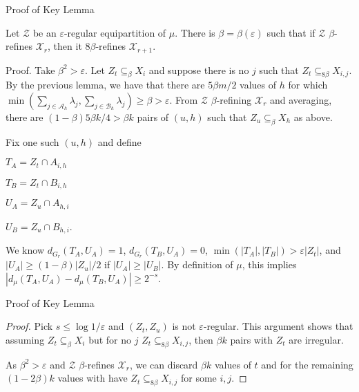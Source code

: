 \documentclass{beamer}
\newcommand{\1}{\mathbbm{1}}
\newcommand{\X}{\mathcal{X}}
\newcommand{\A}{\mathcal{A}}
\newcommand{\B}{\mathcal{B}}
\newcommand{\Z}{\mathcal{Z}}
\newcommand{\eps}{\varepsilon}
\begin{document}
\begin{frame}{Proof of Key Lemma}
  \vspace{-10pt}
  \begin{lemma}
    Let $\Z$ be an $\eps$-regular equipartition of $\mu$. There is $\beta = \beta(\eps)$
    such that if $\Z$ $\beta$-refines $\X_r$, then it $8\beta$-refines $\X_{r + 1}$.
  \end{lemma}
  \vspace{-8pt}
  \begin{block}{Proof.}
    \pause
    Take $\beta^2 > \eps$. Let $Z_t \subseteq_\beta X_i$ and suppose there is no $j$ such
    that $Z_t \subseteq_{8 \beta} X_{i, j}$.
    \pause
    By the previous lemma, we have that there are $5 \beta m/2$ values of $h$ for which
    $\min( \sum_{j \in \A_h} \lambda_j, \sum_{j \in \B_h} \lambda_j) \ge \beta > \eps$.
    \pause
    \alert{From $\Z$ $\beta$-refining $\X_r$ and averaging, there are $(1 - \beta) 5\beta
        k/4 > \beta k$ pairs of $(u, h)$ such that $Z_u \subseteq_\beta X_h$ as above.}

    \pause
    Fix one such $(u, h)$ and define
    \vspace{-10pt}
    \begin{multicols}{4}
      $T_A = Z_t \cap A_{i, h}$

      \break

      $T_B = Z_t \cap B_{i, h}$

      \break

      $U_A = Z_u \cap A_{h, i}$

      \break

      $U_B = Z_u \cap B_{h, i}$.

    \end{multicols}
    \vspace{-10pt}
    \pause
    We know $d_{G_r}(T_A, U_A) = 1$, $d_{G_r}(T_B, U_A) = 0$,
    \pause
    $\min(|T_A|, |T_B|) > \eps |Z_t|$,
    \pause
    and $|U_A| \ge (1 - \beta)|Z_u|/2$ if $|U_A| \ge |U_B|$.
    \pause
    By definition of $\mu$, this implies $|d_\mu(T_A, U_A) - d_\mu(T_B, U_A)| \ge
      2^{-s}$.
  \end{block}
\end{frame}

\begin{frame}{Proof of Key Lemma}
  \begin{proof}
    Pick $s \le \log 1/\eps$ and $(Z_t, Z_u)$ is not $\eps$-regular.
    \pause
    This argument shows that assuming $Z_t \subseteq_\beta X_i$ but for no $j$  $Z_t
      \subseteq_{8 \beta} X_{i, j}$, then $\beta k$ pairs with $Z_t$ are irregular.

    \pause
    As $\beta^2 > \eps$ and $\Z$ $\beta$-refines $\X_r$, we can discard $\beta k$ values
    of $t$ and for the remaining $(1 - 2\beta)k$ values with have $Z_t \subseteq_{8
        \beta} X_{i, j}$ for some $i, j$.
  \end{proof}
\end{frame}
\end{document}
